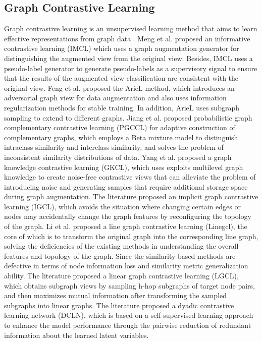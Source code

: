 \subsection{Graph Contrastive Learning}\label{2.2}
Graph contrastive learning is an unsupervised learning method that aims to learn effective representations from graph data \cite{DBLP:journals/ijon/YuJ24}.
Meng et al. \cite{DBLP:conf/cikm/MengL23} proposed an informative contrastive learning (IMCL) which uses a graph augmentation generator for distinguishing the augmented view from the original view. Besides, IMCL uses a pseudo-label generator to generate pseudo-labels as a supervisory signal to ensure that the results of the augmented view classification are consistent with the original view.  Feng et al. \cite{DBLP:journals/tkdd/FengJZT24} proposed the ArieL method, which introduces an adversarial graph view for data augmentation and also uses information regularization methods for stable training. In addition, ArieL uses subgraph sampling to extend to different graphs. Jiang et al. \cite{DBLP:journals/nn/JiangB24} proposed probabilistic graph complementary contrastive learning (PGCCL) for adaptive construction of complementary graphs, which employs a Beta mixture model to distinguish intraclass similarity and interclass similarity, and solves the problem of inconsistent similarity distributions of data. Yang et al. \cite{DBLP:journals/tkde/YangWZCYLX24} proposed a graph knowledge contrastive learning (GKCL), which uses exploits multilevel graph knowledge to create noise-free contrastive views that can alleviate the problem of introducing noise and generating samples that require additional storage space during graph augmentation. The literature \cite{DBLP:journals/nn/LiangDZM0G23} proposed an implicit graph contrastive learning (IGCL), which avoids the situation where changing certain edges or nodes may accidentally change the graph features by reconfiguring the topology of the graph. Li et al. \cite{DBLP:journals/jksucis/LiMYXCZ24} proposed a line graph contrastive learning (Linegcl), the core of which is to transform the original graph into the corresponding line graph, solving the deficiencies of the existing methods in understanding the overall features and topology of the graph. Since the similarity-based methods are defective in terms of node information loss and similarity metric generalization ability.
The literature \cite{DBLP:journals/pr/ZhangSMZ23} proposed a linear graph contrastive learning (LGCL), which obtains subgraph views by sampling h-hop subgraphs of target node pairs, and then maximizes mutual information after transforming the sampled subgraphs into linear graphs. The literature \cite{DBLP:journals/tnn/PengCTLW24} proposed a dyadic contrastive learning network (DCLN), which is based on a self-supervised learning approach to enhance the model performance through the pairwise reduction of redundant information about the learned latent variables.

